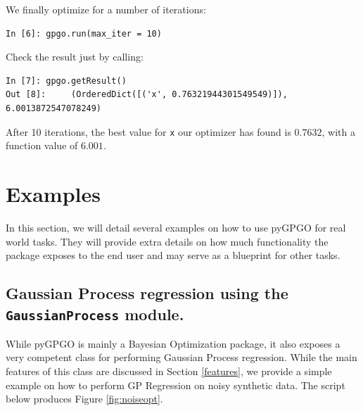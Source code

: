 \documentclass[10pt,a4paper,twoside]{book}
\begin{document}
We finally optimize for a number of iterations:

\begin{verbatim}
In [6]: gpgo.run(max_iter = 10)               
\end{verbatim}

Check the result just by calling:

\begin{verbatim}
In [7]: gpgo.getResult()
Out [8]:	 (OrderedDict([('x', 0.76321944301549549)]), 6.0013872547078249)
\end{verbatim}

After 10 iterations, the best value for \texttt{x} our optimizer has found is $0.7632$, with a function value of $6.001$.

\section{Examples}

In this section, we will detail several examples on how to use pyGPGO for real world tasks. They will provide extra details on how much functionality the package exposes to the end user and may serve as a blueprint for other tasks.


\subsection{Gaussian Process regression using the \texttt{GaussianProcess} module.}

While pyGPGO is mainly a Bayesian Optimization package, it also exposes a very competent class for performing Gaussian Process regression. While the main features of this class are discussed in Section \ref{features}, we provide a simple example on how to perform GP Regression on noisy synthetic data. The script below produces Figure \ref{fig:noiseopt}.
\end{document}
